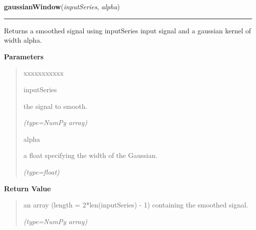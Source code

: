\hspace{.8\funcindent}\begin{boxedminipage}{\funcwidth}

    \raggedright \textbf{gaussianWindow}(\textit{inputSeries}, \textit{alpha})

    \vspace{-1.5ex}

    \rule{\textwidth}{0.5\fboxrule}
\setlength{\parskip}{2ex}
    Returns a smoothed signal using {\textbar}inputSeries{\textbar} input 
    signal and a gaussian kernel of width {\textbar}alpha{\textbar}.

\setlength{\parskip}{1ex}
      \textbf{Parameters}
      \vspace{-1ex}

      \begin{quote}
        \begin{Ventry}{xxxxxxxxxxx}

          \item[inputSeries]

          the signal to smooth.

            {\it (type=NumPy array)}

          \item[alpha]

          a float specifying the width of the Gaussian.

            {\it (type=float)}

        \end{Ventry}

      \end{quote}

      \textbf{Return Value}
    \vspace{-1ex}

      \begin{quote}
      an array (length = 2*len({\textbar}inputSeries{\textbar}) - 1) 
      containing the smoothed signal.

      {\it (type=NumPy array)}

      \end{quote}

    \end{boxedminipage}

    \label{nMOLDYN:Core:Mathematics:factorial}

    \vspace{0.5ex}

